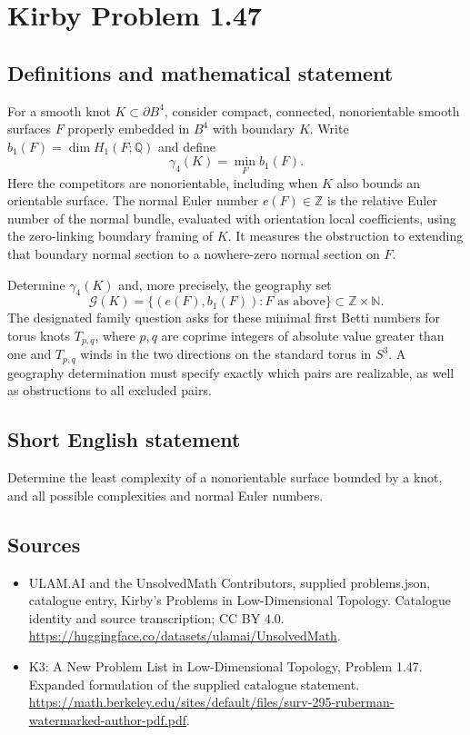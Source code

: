 \documentclass[11pt,a4paper]{article}
\begin{document}
\section*{Kirby Problem 1.47}\label{statement}

\subsection{Definitions and mathematical statement}
For a smooth knot $K\subset\partial B^4$, consider compact, connected,
nonorientable smooth surfaces $F$ properly embedded in $B^4$ with boundary $K$.
Write $b_1(F)=\dim H_1(F;\mathbb Q)$ and define
\[
\gamma_4(K)=\min_F b_1(F).
\]
Here the competitors are nonorientable, including when $K$ also bounds an
orientable surface. The normal Euler number $e(F)\in\mathbb Z$ is the relative
Euler number of the normal bundle, evaluated with orientation local coefficients,
using the zero-linking boundary framing of $K$. It measures the obstruction to
extending that boundary normal section to a nowhere-zero normal section on $F$.

Determine $\gamma_4(K)$ and, more precisely, the geography set
\[
\mathcal G(K)=\{(e(F),b_1(F)):F\text{ as above}\}\subset\mathbb Z\times\mathbb N.
\]
The designated family question asks for these minimal first Betti numbers for
torus knots $T_{p,q}$, where $p,q$ are coprime integers of absolute value greater
than one and $T_{p,q}$ winds in the two directions on the standard torus in
$S^3$. A geography determination must specify exactly which pairs are realizable,
as well as obstructions to all excluded pairs.
\subsection{Short English statement}
Determine the least complexity of a nonorientable surface bounded by a knot, and all possible complexities and normal Euler numbers.
\subsection{Sources}
\begin{itemize}
\item[S1] ULAM.AI and the UnsolvedMath Contributors, supplied problems.json, catalogue entry, Kirby's Problems in Low-Dimensional Topology. Catalogue identity and source transcription; CC BY 4.0.
\url{https://huggingface.co/datasets/ulamai/UnsolvedMath}.
\item[S2] K3: A New Problem List in Low-Dimensional Topology, Problem 1.47. Expanded formulation of the supplied catalogue statement.
\url{https://math.berkeley.edu/sites/default/files/surv-295-ruberman-watermarked-author-pdf.pdf}.
\end{itemize}
\end{document}
